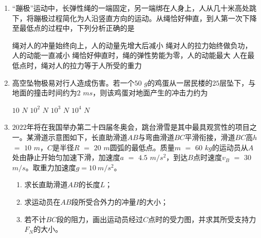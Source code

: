 \begin{enumerate}[leftmargin=0em]
\item
{}
“蹦极”运动中，长弹性绳的一端固定，另一端绑在人身上，人从几十米高处跳下，将蹦极过程简化为人沿竖直方向的运动。从绳恰好伸直，到人第一次下降至最低点的过程中，下列分析正确的是  

\fourchoices
{绳对人的冲量始终向上，人的动量先增大后减小}
{绳对人的拉力始终做负功，人的动能一直减小}
{绳恰好伸直时，绳的弹性势能为零，人的动能最大}
{人在最低点时，绳对人的拉力等于人所受的重力}



\item
{}
高空坠物极易对行人造成伤害。若一个$ 50 $ $ g $的鸡蛋从一居民楼的$ 25 $层坠下，与地面的撞击时间约为$ 2 $ $ ms $，则该鸡蛋对地面产生的冲击力约为  

\fourchoices
{$ 10 $ $ N $}
{$ 10^2 $ $ N $	}
{$ 10^3 $ $ N $	 }
{$ 10^4 $ $ N $}

\item 
{}
$ 2022 $年将在我国举办第二十四届冬奥会，跳台滑雪是其中最具观赏性的项目之一。某滑道示意图如下，长直助滑道$ AB $与弯曲滑道$ BC $平滑衔接，滑道$ BC $高$ h $ $ = $ $ 10 $ $ m $，$ C $是半径$ R $ $ = $ $ 20 $ $ m $圆弧的最低点。质量$ m $ $ = $ $ 60 $ $ kg $的运动员从$ A $处由静止开始匀加速下滑，加速度$ a $ $ = $ $ 4.5 $ $ m/s^{2} $，到达$ B $点时速度$ v_{B} $ $ = $ $ 30 $ $ m/s $。取重力加速度$ g=10\ m/s^{2} $。
\begin{enumerate}
\renewcommand{\labelenumi}{\arabic{enumi}.}
\item
求长直助滑道$ AB $的长度$ L $；
\item 
求运动员在$ AB $段所受合外力的冲量$ I $的大小；
\item 
若不计$ BC $段的阻力，画出运动员经过$ C $点时的受力图，并求其所受支持力$ F_{N} $的大小。

\end{enumerate}
\begin{figure}[h!]
\flushright

\end{figure}

\end{enumerate}
